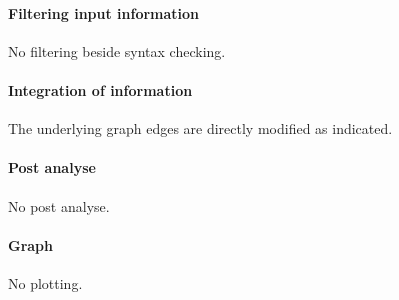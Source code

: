 \paragraph{Filtering input information}

No filtering beside syntax checking.

\paragraph{Integration of information}

The underlying graph edges are directly modified as indicated. 

\paragraph{Post analyse}

No post analyse.

\paragraph{Graph}

No plotting.




